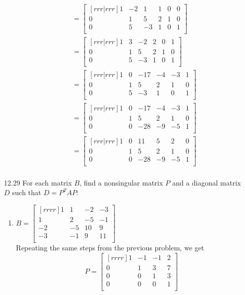 \documentclass[12pt]{article}
\theoremstyle{definition}
\theoremstyle{plain}
\begin{document}
\begin{enumerate}
\begin{enumerate}
\begin{align*}
	&=\begin{bmatrix}[rrr|rrr]1&-2&1&1&0&0\\0&1&5&2&1&0\\0&5&-3&1&0&1\\\end{bmatrix}\\
	&=\begin{bmatrix}[rrr|rrr]1&3&-2&2&0&1\\0&1&5&2&1&0\\0&5&-3&1&0&1\\\end{bmatrix}\\
	&=\begin{bmatrix}[rrr|rrr]1&0&-17&-4&-3&1\\0&1&5&2&1&0\\0&5&-3&1&0&1\\\end{bmatrix}\\
	&=\begin{bmatrix}[rrr|rrr]1&0&-17&-4&-3&1\\0&1&5&2&1&0\\0&0&-28&-9&-5&1\\\end{bmatrix}\\
	&=\begin{bmatrix}[rrr|rrr]1&0&11&5&2&0\\0&1&5&2&1&0\\0&0&-28&-9&-5&1\\\end{bmatrix}\\
	\end{align*}
	\end{enumerate}		
\item[12.29]For each matrix $B$, find a nonsingular matrix $P$ and a diagonal matrix $D$ such that $D=P^TAP$:
	\begin{enumerate}
	\item $B=\begin{bmatrix}[rrrr]1&1&-2&-3\\1&2&-5&-1\\-2&-5&10&9\\-3&-1&9&11\\\end{bmatrix}$\\
	Repeating the same steps from the previous problem, we get
	\[ P=\begin{bmatrix}[rrrr]1&-1&-1&2\\0&1&3&7\\0&0&1&3\\0&0&0&1\\\end{bmatrix} \]

\end{enumerate}
\end{enumerate}
\end{document}
